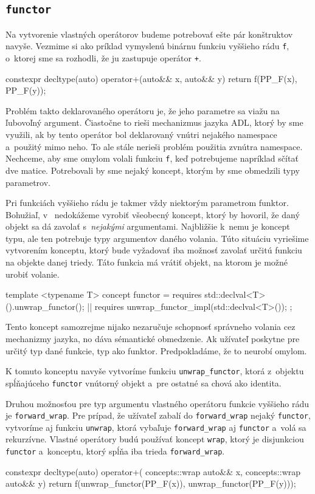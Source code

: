 \subsection{\texttt{functor}}

Na vytvorenie vlastných operátorov budeme potrebovať ešte pár konštruktov navyše. Vezmime si ako príklad vymyslenú binárnu funkciu vyššieho rádu \texttt{f}, o~ktorej sme sa rozhodli, že ju zastupuje operátor \texttt{+}.
\begin{code}
constexpr decltype(auto) operator+(auto&& x, auto&& y) 
{ return f(PP_F(x), PP_F(y)); }
\end{code}
Problém takto deklarovaného operátoru je, že jeho parametre sa viažu na ľubovoľný argument. Čiastočne to rieši mechanizmus jazyka ADL, ktorý by sme využili, ak by tento operátor bol deklarovaný vnútri nejakého namespace a~použitý mimo neho. To ale stále nerieši problém použitia zvnútra namespace. Nechceme, aby sme omylom volali funkciu \texttt{f}, keď potrebujeme napríklad sčítať dve matice. Potrebovali by sme nejaký koncept, ktorým by sme obmedzili typy parametrov.

Pri funkciách vyššieho rádu je takmer vždy niektorým parametrom funktor. Bohužiaľ, v~\Cpp{} nedokážeme vyrobiť všeobecný koncept, ktorý by hovoril, že daný objekt sa dá zavolať s~\emph{nejakými} argumentami. Najbližšie k~nemu je koncept  typu, ale ten potrebuje typy argumentov daného volania. Túto situáciu vyriešime vytvorením konceptu, ktorý bude vyžadovať iba možnosť zavolať určitú funkciu na objekte danej triedy. Táto funkcia má vrátiť objekt, na ktorom je možné urobiť volanie.
\begin{code}
template <typename T>
concept functor = requires { std::declval<T>().unwrap_functor(); } ||
                  requires { unwrap_functor_impl(std::declval<T>()); };
\end{code}
Tento koncept samozrejme nijako nezaručuje schopnosť správneho volania cez mechanizmy jazyka, no dáva sémantické obmedzenie. Ak užívateľ poskytne pre určitý typ dané funkcie,  typ ako funktor. Predpokladáme, že to neurobí omylom.

K tomuto konceptu navyše vytvoríme funkciu \texttt{unwrap\_functor}, ktorá z~objektu spĺňajúceho \texttt{functor}  vnútorný objekt a~pre ostatné sa chová ako identita.

Druhou možnosťou pre typ argumentu vlastného operátoru funkcie vyššieho rádu je \texttt{forward\_wrap}. Pre prípad, že užívateľ zabalí do \texttt{forward\_wrap} nejaký \texttt{functor}, vytvoríme aj funkciu \texttt{unwrap}, ktorá vybaľuje \texttt{forward\_wrap} aj \texttt{functor} a~volá sa rekurzívne. Vlastné operátory budú používať koncept \texttt{wrap}, ktorý je disjunkciou \texttt{functor} a~konceptu, ktorý spĺňa iba trieda \texttt{forward\_wrap}.
\begin{code}
constexpr decltype(auto) operator+(
    concepts::wrap auto&& x, concepts::wrap auto&& y) 
{ return f(unwrap_functor(PP_F(x)), unwrap_functor(PP_F(y))); }
\end{code}

